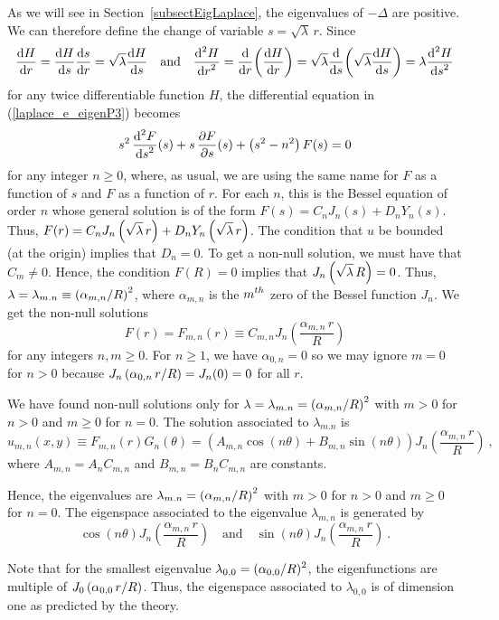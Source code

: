 As we will see in Section~\ref{subsectEigLaplace}, the eigenvalues of
$-\Delta$ are positive.  We can therefore define the change of
variable $s=\sqrt{\lambda}\,r$.  Since
\[
\dydx{H}{r} = \dydx{H}{s} \dydx{s}{r} = \sqrt{\lambda} \dydx{H}{s}
\quad \text{and} \quad
\dydxn{H}{r}{2} = \dfdx{\left(\dydx{H}{r}\right)}{r}
= \sqrt{\lambda}\dfdx{\left(\sqrt{\lambda}\dydx{H}{s}\right)}{s}
= \lambda \dydxn{H}{s}{2}
\]
for any twice differentiable function $H$, the differential equation
in (\ref{laplace_e_eigenP3}) becomes
\[
s^2\,\dydxn{F}{s}{2}(s) + s\, \pdydx{F}{s}(s)
+ \left(s^2 -n^2\right) F(s) = 0
\]
for any integer $n \geq 0$, where, as usual, we are using the same name
for $F$ as a function of $s$ and $F$ as a function of $r$.  For each
$n$, this is the Bessel equation of order $n$ whose general solution
is of the form $F(s) = C_n J_n(s) + D_n Y_n(s)$.  Thus,
$\DS F(r) = C_n J_n\left(\sqrt{\lambda}\, r\right) + D_n
Y_n\left(\sqrt{\lambda} \, r\right)$.
The condition that $u$ be bounded (at the origin) implies that $D_n=0$.
To get a non-null solution, we must have that $C_m \neq 0$.
Hence, the condition $F(R) = 0$ implies that
$\DS J_n\left(\sqrt{\lambda}\, R\right)= 0$.  Thus,
$\DS \lambda = \lambda_{m.n} \equiv \left(\alpha_{m,n}/R\right)^2$,
where $\alpha_{m,n}$ is the $\DS m^{th}$ zero of the Bessel
function $J_n$.  We get the non-null solutions
\[
  F(r) = F_{m,n}(r) \equiv C_{m,n} J_n\left(\frac{\alpha_{m,n}\,r}{R}\right)
\]
for any integers $n,m \geq 0$.
For $n\geq 1$, we have $\alpha_{0,n} =0$ so we may ignore $m=0$ for
$n>0$ because $\DS J_n\left(\alpha_{0,n}\,r/R\right) = J_n(0) = 0$
for all $r$.

We have found non-null solutions only for
$\DS \lambda = \lambda_{m.n} = \left(\alpha_{m,n}/R\right)^2$
with $m>0$ for $n>0$ and $m\geq 0$ for $n=0$.
The solution associated to $\lambda_{m.n}$ is
\[
u_{m,n}(x,y) \equiv F_{m,n}(r) G_n(\theta) =
\left( A_{m,n} \cos\left(n\theta\right)
+ B_{m,n} \sin\left(n\theta\right) \right)
J_n\left(\frac{\alpha_{m,n}\,r}{R}\right) \  ,
\]
where $A_{m,n} = A_n C_{m,n}$ and $B_{m,n} = B_n C_{m,n}$ are constants.

Hence, the eigenvalues are
$\DS \lambda_{m.n} = \left(\alpha_{m,n}/R\right)^2$ 
with $m>0$ for $n>0$ and $m\geq 0$ for $n=0$.
The eigenspace associated to the eigenvalue $\lambda_{m,n}$ is
generated by
\[
\cos\left(n\theta\right)J_n\left(\frac{\alpha_{m,n}\,r}{R}\right)
\quad \text{and} \quad
\sin\left(n\theta\right)J_n\left(\frac{\alpha_{m,n}\,r}{R}\right) \ .
\]

Note that for the smallest eigenvalue
$\DS \lambda_{0,0} = (\alpha_{0,0}/R)^2$,
the eigenfunctions are multiple of
$\DS J_0\left(\alpha_{0,0}\,r/R\right)$.  Thus, the
eigenspace associated to $\lambda_{0,0}$ is of dimension one as
predicted by the theory.

